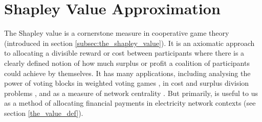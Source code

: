 
\pagebreak
\section{Shapley Value Approximation}\label{sec:shapley}

The Shapley value is a cornerstone measure in cooperative game theory (introduced in section \ref{subsec:the_shapley_value}). 
It is an axiomatic approach to allocating a divisible reward or cost between participants where there is a clearly defined notion of how much surplus or profit a coalition of participants could achieve by themselves.
It has many applications, 
including analysing the power of voting blocks in weighted voting games \citep{Bachrach2009ApproximatingPI}, 
in cost and surplus division problems  \citep{AzizEtal2016,archie_paper1}, 
and as a measure of network centrality \citep{Michalak:2013}.
But primarily, is useful to us as a method of allocating financial payments in electricity network contexts (see section \ref{the_value_def}).



